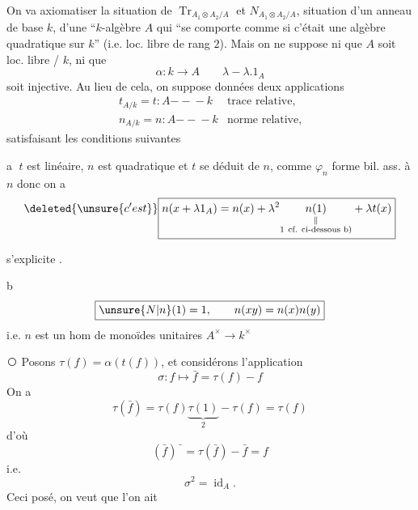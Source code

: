 On va axiomatiser la situation de  $\operatorname{Tr}_{A_1\otimes A_2/A}$ et $N_{A_1\otimes A_2/A}$,  situation d'un anneau de base $k$,  d'une ``$k$-algèbre $A$ qui ``se comporte comme si c'était une algèbre quadratique sur $k$'' (i.e. loc. libre de rang $2$). Mais on ne suppose ni que $A$ soit loc. libre  / $k$, ni que
\[
 \alpha:k\longrightarrow A\qquad\lambda\mathrel{-}\lambda.1_A
\]
soit injective. Au lieu de cela, on suppose données deux applications
\[
 \begin{array}{lll}
 t_{A/k}=t:A\mathrel{-\!\!-\!\!-}k&\text{trace relative},\\
 n_{A/k}=n:A\mathrel{-\!\!-\!\!-}k&\text{norme relative},
 \end{array}
\]
satisfaisant les conditions suivantes

\textcircled{a} $t$ est linéaire, $n$ est quadratique et $t$ se déduit de $n$, comme  $\varphi_n$ forme bil. ass. à $n$
donc on a
\[
 \deleted{\unsure{c'est}}\boxed{n(x+\lambda 1_A)=n(x)+\lambda^2\underset{\substack{\Vert\\1\ \text{cf. ci-dessous b)}}}{n(1)}+\lambda t(x)}
\]

  s'explicite .

\textcircled{b}
\[
 \boxed{\unsure{N|n}(1)=1,\qquad n(xy)=n(x)n(y)}
\]
i.e. $n$ est un hom de monoïdes unitaires $A^\times\longrightarrow k^\times$

\textcircled{}
Posons $\tau(f)=\alpha(t(f))$, et considérons l'application
\[
 \sigma:f\longmapsto\bar f=\tau(f)-f
\]
On a
\[
 \tau(\bar f)=\tau(f)\underbrace{\tau(1)}_{2}-\tau(f)=\tau(f)
\]
d'où
\[
 (\bar f)\bar{\phantom f}=\tau(\bar f)-\bar f=f
\]
i.e. 
\[
 \sigma^2=\operatorname{id}_A.
\]
Ceci posé, on veut que l'on ait


